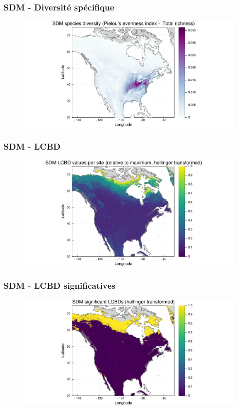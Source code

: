 \documentclass[10pt]{beamer}
\begin{document}
\begin{frame}
  \frametitle{SDM - Diversité spécifique}
  \begin{figure}
    \centering
    \includegraphics[scale=0.4]{fig/sdm-diversity-pielou2.pdf}
  \end{figure}
\end{frame}

\begin{frame}
  \frametitle{SDM - LCBD}
  \begin{figure}
    \centering
    \includegraphics[scale=0.4]{fig/sdm-lcbd-transf.pdf}
  \end{figure}
\end{frame}

\begin{frame}
  \frametitle{SDM - LCBD significatives}
  \begin{figure}
    \centering
    \includegraphics[scale=0.4]{fig/sdm-lcbd-signif.pdf}
  \end{figure}
\end{frame}
\end{document}

